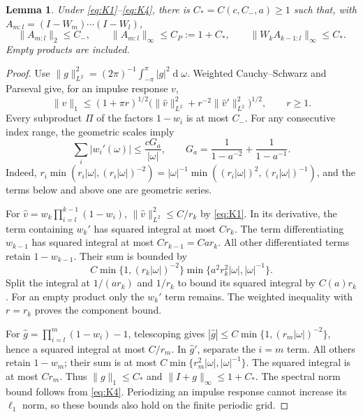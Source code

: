 \documentclass[11pt]{article}
\newcommand{\norm}[1]{\lVert #1\rVert}
\newcommand{\dd}{\mathop{\mathrm d}}
\newtheorem{lemma}[proposition]{Lemma}
\theoremstyle{remark}
\begin{document}
\begin{lemma}\label{lem:linear}
Under \eqref{eq:K1}--\eqref{eq:K4}, there is \(C_*=C(c,C_-,a)\ge1\) such that,
with \(A_{m:l}=(I-W_m)\cdots(I-W_l)\),
\[
 \norm{A_{m:l}}_2\le C_-,\qquad
 \norm{A_{m:l}}_\infty\le C_P:=1+C_*,\qquad
 \norm{W_kA_{k-1:l}}_\infty\le C_* .
\]
Empty products are included.
\end{lemma}
\begin{proof}
Use \(\norm{g}_{L^2}^2=(2\pi)^{-1}\int_{-\pi}^{\pi}|g|^2\dd\omega\).
Weighted Cauchy--Schwarz and Parseval give, for an impulse response \(v\),
\[
 \norm{v}_1\le(1+\pi r)^{1/2}
  \bigl(\norm{\widehat v}_{L^2}^2+r^{-2}\norm{\widehat v'}_{L^2}^2\bigr)^{1/2},
 \qquad r\ge1.
\]
Every subproduct \(\Pi\) of the factors \(1-w_i\) is at most \(C_-\).
For any consecutive index range, the geometric scales imply
\[
 \sum_i|w_i'(\omega)|\le\frac{cG_a}{|\omega|},\qquad
 G_a=\frac1{1-a^{-2}}+\frac1{1-a^{-1}}.
\]
Indeed, \(r_i\min(r_i|\omega|,(r_i|\omega|)^{-2})
=|\omega|^{-1}\min((r_i|\omega|)^2,(r_i|\omega|)^{-1})\), and the
terms below and above one are geometric series.

For \(\widehat v=w_k\prod_{i=l}^{k-1}(1-w_i)\),
\(\norm{\widehat v}_{L^2}^2\le C/r_k\) by \eqref{eq:K1}.
In its derivative, the term containing \(w_k'\) has squared integral
at most \(Cr_k\). The term differentiating \(w_{k-1}\) has squared integral
at most \(Cr_{k-1}=Car_k\). All other differentiated terms retain
\(1-w_{k-1}\). Their sum is bounded by
\[
 C\min\{1,(r_k|\omega|)^{-2}\}
       \min\{a^2r_k^2|\omega|,|\omega|^{-1}\}.
\]
Split the integral at \(1/(ar_k)\) and \(1/r_k\) to bound its squared
integral by \(C(a)r_k\). For an empty product only the \(w_k'\) term remains.
The weighted inequality with \(r=r_k\) proves the component bound.

For \(\widehat g=\prod_{i=l}^m(1-w_i)-1\), telescoping gives
\(|\widehat g|\le C\min\{1,(r_m|\omega|)^{-2}\}\), hence a squared
integral at most \(C/r_m\). In \(\widehat g'\), separate the \(i=m\) term.
All others retain \(1-w_m\); their sum is at most
\(C\min\{r_m^2|\omega|,|\omega|^{-1}\}\).
The squared integral is at most \(Cr_m\). Thus \(\norm g_1\le C_*\) and
\(\norm{I+g}_\infty\le1+C_*\). The spectral norm bound follows from
\eqref{eq:K4}. Periodizing an impulse response cannot increase its
\(\ell_1\) norm, so these bounds also hold on the finite periodic grid.
\end{proof}
\end{document}
